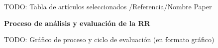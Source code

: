 \documentclass[conference]{IEEEtran}
\begin{document}
TODO: Tabla de artículos seleccionados 
/Referencia/Nombre Paper 







\textbf{Proceso de análisis y evaluación de la RR}

TODO: Gráfico de proceso y ciclo de evaluación
(en formato gráfico)
\end{document}
